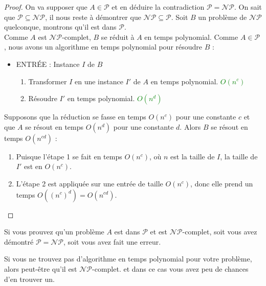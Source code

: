 \begin{proof}
    On va supposer que $A\in\mathcal{P}$ et en déduire la contradiction $\mathcal{P}=\mathcal{NP}$. On sait que $\mathcal{P}
    \subseteq\mathcal{NP}$, il nous reste à démontrer que $\mathcal{NP}\subseteq\mathcal{P}$. Soit $B$ un problème de 
    $\mathcal{NP}$ quelconque, montrons qu'il est dans $\mathcal{P}$. \\
    Comme $A$ est $\mathcal{NP}$-complet, $B$ se réduit à $A$ en temps polynomial. Comme $A\in\mathcal{P}$, nous avons un 
    algorithme en temps polynomial pour résoudre $B$ :
    \begin{itemize}[label=\textbullet]
        \item ENTRÉE : Instance $I$ de $B$
        \begin{enumerate}
            \item Transformer $I$ en une instance $I'$ de $A$ en temps polynomial. \textcolor{green}{$O(n^c)$}
            \item Résoudre $I'$ en temps polynomial. \textcolor{green}{$O(n^d)$}
        \end{enumerate}
    \end{itemize}
    Supposons que la réduction se fasse en temps $O(n^c)$ pour une constante $c$ et que $A$ se résout en temps $O(n^d)$ pour
    une constante $d$. Alors $B$ se résout en temps $O(n^{cd})$ :
    \begin{enumerate}
        \item Puisque l'étape 1 se fait en temps $O(n^c)$, où $n$ est la taille de $I$, la taille de $I'$ est en $O(n^c)$.
        \item L'étape 2 est appliquée sur une entrée de taille $O(n^c)$, donc elle prend un temps $O((n^c)^d) = O(n^{cd})$.
    \end{enumerate}
\end{proof}
\begin{lemma}{}{}
    Si vous prouvez qu'un problème $A$ est dans $\mathcal{P}$ et est $\mathcal{NP}$-complet, soit vous avez démontré 
    $\mathcal{P}=\mathcal{NP}$, soit vous avez fait une erreur.
\end{lemma}
\begin{lemma}{}{}
    Si vous ne trouvez pas d'algorithme en temps polynomial pour votre problème, alors peut-être qu'il est $\mathcal{NP}$-complet.
    et dans ce cas vous avez peu de chances d'en trouver un.
\end{lemma}

